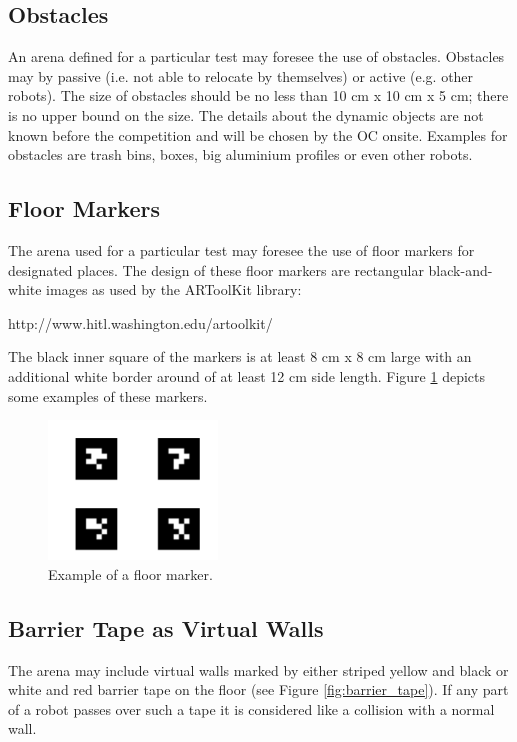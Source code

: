 \subsection{Obstacles}
An arena defined for a particular test may foresee the use of obstacles. Obstacles may by passive (i.e. not able to relocate by themselves) or active (e.g. other robots). The size of obstacles should be no less than 10 cm x 10 cm x 5 cm; there is no upper bound on the size. The details about the dynamic objects are not known before the competition and will be chosen by the OC onsite. Examples for obstacles are trash bins, boxes, big aluminium profiles or even other robots.

\subsection{Floor Markers}
The arena used for a particular test may foresee the use of floor markers for designated places. The design of these floor markers are rectangular black-and-white images as used by the ARToolKit library:

http://www.hitl.washington.edu/artoolkit/

The black inner square of the markers is at least 8 cm x 8 cm large with an additional white border around of at least 12 cm side length. Figure \ref{fig:floor_marker} depicts some examples of these markers.

\begin{figure}
\centering
\includegraphics[width= 0.4\textwidth ]{../images/example_floor_marker.png}
\caption{Example of a floor marker.}
\label{fig:floor_marker}
\end{figure}


\subsection{Barrier Tape as Virtual Walls}
The arena may include virtual walls marked by either striped yellow and black or white and red barrier tape on the floor (see Figure \ref{fig:barrier_tape}). If any part of a robot passes over such a tape it is considered like a collision with a normal wall.

